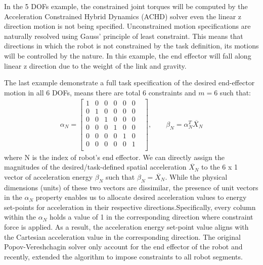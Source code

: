 \documentclass[report.tex]{subfiles}
\begin{document}
    In the 5 DOFs example, the constrained joint torques will be computed by the Acceleration Constrained Hybrid Dynamics (ACHD) solver even the linear z direction motion is not being specified. Unconstrained motion specifications are naturally resolved using Gauss' principle of least constraint. This means that directions in which the robot is not constrained by the task definition, its motions will be controlled by the nature. In this example, the end effector will fall along linear z direction due to the weight of the link and gravity.

    The last example demonstrate a full task specification of the desired end-effector motion in all 6 DOFs, means there are total 6 constraints and $m = 6$ such that:
    \begin{align}
        \alpha_N = \begin{bmatrix}
            1&0&0&0&0&0&\\
            0&1&0&0&0&0&\\
            0&0&1&0&0&0&\\
            0&0&0&1&0&0&\\
            0&0&0&0&1&0&\\
            0&0&0&0&0&1&\\ 
        \end{bmatrix} ,\qquad
        \beta_N = \alpha_N^T \ddot{X_N}
    \end{align}
    where N is the index of robot's end effector. We can directly assign  the magnitudes of the desired/task-defined spatial acceleration $\ddot{X_N}$ to the 6 x 1 vector of acceleration energy $\beta_N$ such that $\beta_N =  \ddot{X_N}$. While the physical dimensions (units) of these two vectors are dissimilar, the presence of unit vectors in the $\alpha_N$ property enables us to allocate desired acceleration values to energy set-points for acceleration in their respective directions.Specifically, every column within the $\alpha_N$ holds a value of 1 in the corresponding direction where constraint force is applied. As a result, the acceleration energy set-point value aligns with the Cartesian acceleration value in the corresponding direction.
    The original Popov-Vereshchagin solver only account for the end effector of the robot and recently,\cite{shakhimardanov2015composable} extended the algorithm to impose constraints to all robot segments.
\end{document}
